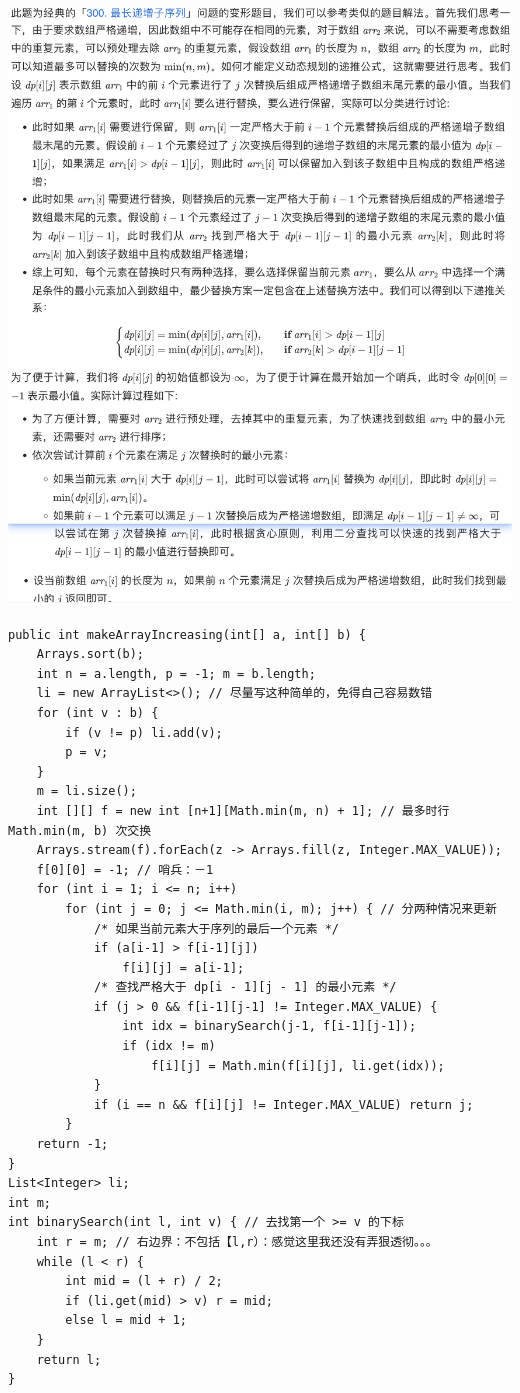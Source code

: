 \documentclass[9pt, b5paaper]{book}
\begin{document}
\includegraphics[width=.9\linewidth]{./pic/dp_20230501_092059.png}
\begin{verbatim}
public int makeArrayIncreasing(int[] a, int[] b) {
    Arrays.sort(b);
    int n = a.length, p = -1; m = b.length;
    li = new ArrayList<>(); // 尽量写这种简单的，免得自己容易数错
    for (int v : b) {
        if (v != p) li.add(v);
        p = v;
    }
    m = li.size(); 
    int [][] f = new int [n+1][Math.min(m, n) + 1]; // 最多时行 Math.min(m, b) 次交换
    Arrays.stream(f).forEach(z -> Arrays.fill(z, Integer.MAX_VALUE));
    f[0][0] = -1; // 哨兵：－1
    for (int i = 1; i <= n; i++) 
        for (int j = 0; j <= Math.min(i, m); j++) { // 分两种情况来更新
            /* 如果当前元素大于序列的最后一个元素 */
            if (a[i-1] > f[i-1][j])
                f[i][j] = a[i-1];
            /* 查找严格大于 dp[i - 1][j - 1] 的最小元素 */
            if (j > 0 && f[i-1][j-1] != Integer.MAX_VALUE) {
                int idx = binarySearch(j-1, f[i-1][j-1]);
                if (idx != m)
                    f[i][j] = Math.min(f[i][j], li.get(idx));
            }
            if (i == n && f[i][j] != Integer.MAX_VALUE) return j;
        }
    return -1;
}
List<Integer> li;
int m;
int binarySearch(int l, int v) { // 去找第一个 >= v 的下标
    int r = m; // 右边界：不包括【l,r）：感觉这里我还没有弄狠透彻。。。
    while (l < r) {
        int mid = (l + r) / 2;
        if (li.get(mid) > v) r = mid;
        else l = mid + 1;
    }
    return l;
}
\end{verbatim}
\end{document}
